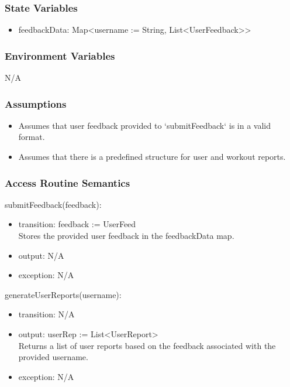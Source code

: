 \documentclass[12pt, titlepage]{article}
\begin{document}
\subsubsection{State Variables}
\begin{itemize}
    \item feedbackData: Map\textless username := String, List\textless UserFeedback\textgreater\textgreater
\end{itemize}


\subsubsection{Environment Variables}
N/A

\subsubsection{Assumptions}
\begin{itemize}
\item Assumes that user feedback provided to `submitFeedback` is in a valid format.
\item Assumes that there is a predefined structure for user and workout reports.
\end{itemize}


\subsubsection{Access Routine Semantics}

\noindent submitFeedback(feedback):
\begin{itemize}
\item transition: feedback := UserFeed \\
Stores the provided user feedback in the feedbackData map.
\item output: N/A
\item exception: N/A
\end{itemize}

\noindent generateUserReports(username):
\begin{itemize}
\item transition: N/A
\item output:  userRep := List\textless UserReport\textgreater \\
Returns a list of user reports based on the feedback associated with the provided username.
\item exception: N/A
\end{itemize}
\end{document}
